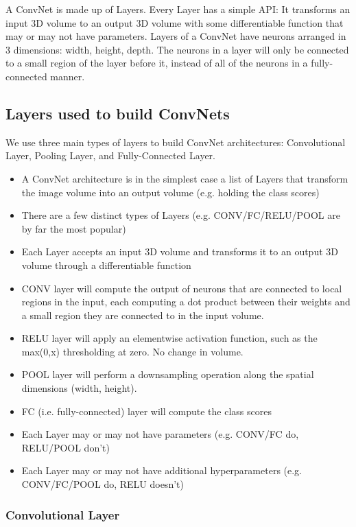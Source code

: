 \documentclass[letterpaper]{article}
\begin{document}
A ConvNet is made up of Layers. Every Layer has a simple API: It transforms an input 3D volume to an output 3D volume with some differentiable function that may or may not have parameters. Layers of a ConvNet have neurons arranged in 3 dimensions: width, height, depth. The neurons in a layer will only be connected to a small region of the layer before it, instead of all of the neurons in a fully-connected manner. 

\subsection{Layers used to build ConvNets}

We use three main types of layers to build ConvNet architectures: Convolutional Layer, Pooling Layer, and Fully-Connected Layer. 

\begin{itemize}
	\item A ConvNet architecture is in the simplest case a list of Layers that transform the image volume into an output volume (e.g. holding the class scores)
	\item There are a few distinct types of Layers (e.g. CONV/FC/RELU/POOL are by far the most popular)
	\item Each Layer accepts an input 3D volume and transforms it to an output 3D volume through a differentiable function
	\item CONV layer will compute the output of neurons that are connected to local regions in the input, each computing a dot product between their weights and a small region they are connected to in the input volume. 
	\item RELU layer will apply an elementwise activation function, such as the max(0,x) thresholding at zero. No change in volume.
	\item POOL layer will perform a downsampling operation along the spatial dimensions (width, height).
	\item FC (i.e. fully-connected) layer will compute the class scores
	\item Each Layer may or may not have parameters (e.g. CONV/FC do, RELU/POOL don’t)
	\item Each Layer may or may not have additional hyperparameters (e.g. CONV/FC/POOL do, RELU doesn’t)
\end{itemize}

\subsubsection{Convolutional Layer}
\end{document}
